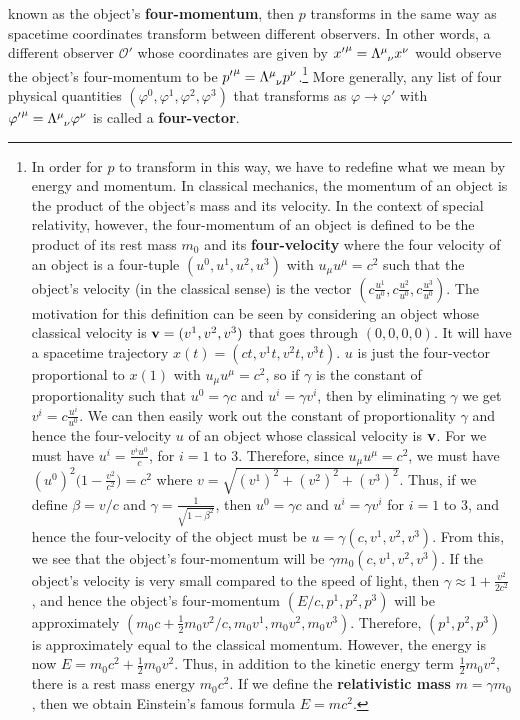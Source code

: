  known as the object's \textbf{four-momentum}, then $p$ transforms in the same way as spacetime coordinates transform between different observers. In other words, a different observer $\mathcal{O}'$ whose coordinates are given by ${x'}^\mu=\Lambda\indices{^\mu_\nu}x^\nu$ would observe the object's four-momentum to be ${p'}^\mu=\Lambda\indices{^\mu_\nu}p^\nu$.\footnote{\label{srdefivation}In order for $p$ to transform in this way, we have to redefine what we mean by energy and momentum. In classical mechanics, the momentum of an object is the product of the object's mass and its velocity. In the context of special relativity, however, the four-momentum of an object is defined to be the product of its rest mass $m_0$ and its \textbf{four-velocity} where the four velocity of an object is a four-tuple $(u^0, u^1, u^2, u^3)$ with $u_\mu u^\mu=c^2$ such that the object's velocity (in the classical sense) is the vector $(c \frac{u^1}{u^0}, c \frac{u^2}{u^0}, c\frac{u^3}{u^0})$. The motivation for this definition can be seen by considering an object whose classical velocity is $\vb{v}=(v^1,v^2,v^3)$ that goes through $(0,0,0,0)$. It will have a spacetime trajectory $x(t)=(ct, v^1 t, v^2 t, v^3 t)$. $u$ is just the four-vector proportional to $x(1)$ with $u_\mu u^\mu=c^2$, so if $\gamma$ is the constant of proportionality such that $u^0=\gamma c$ and $u^i=\gamma v^i$, then by eliminating $\gamma$ we get $v^i=c\frac{u^i}{u^0}$.  We can then easily work out the constant of proportionality $\gamma$ and hence the
four-velocity $u$ of an object whose classical velocity is $\vb{v}$. For we must have $u^i=\frac{v^i u^0}{c}$, for $i=1$ to $3$. Therefore, since $u_\mu u^\mu=c^2$, we must have $(u^0)^2\big(1-\frac{v^2}{c^2}\big)=c^2$ where $v=\sqrt{({v}^1)^2+({v}^2)^2+({v}^3)^2}$. Thus, if we define $\beta={v}/{c}$ and $\gamma=\frac{1}{\sqrt{1-\beta^2}}$, then $u^0=\gamma c$ and $u^i=\gamma v^i$ for $i=1$ to $3$, and hence the four-velocity of the object must be $u=\gamma(c,v^1,v^2,v^3).$ From this, we see that the object's four-momentum will be $\gamma m_0(c,v^1,v^2,v^3).$ If the object's velocity is very small compared to the speed of light, then $\gamma\approx 1+\frac{v^2}{2c^2}$, and hence the object's four-momentum $(E/c, p^1, p^2, p^3)$ will be approximately $(m_0c+\frac{1}{2}m_0{v^2}/c, m_0v^1,m_0v^2,m_0v^3)$. Therefore, $(p^1, p^2, p^3)$ is approximately equal to the classical momentum. However, the energy is now $E=m_0c^2+\frac{1}{2}m_0{v^2}$. Thus, in addition to the kinetic energy term $\frac{1}{2}m_0{v^2}$, there is a rest mass energy $m_0c^2$. If we define the \textbf{relativistic mass} $m=\gamma m_0$, then we obtain Einstein's famous formula $E=mc^2$.  } More generally, any list of four physical quantities $(\varphi^0, \varphi^1, \varphi^2, \varphi^3)$ that transforms as $\varphi\rightarrow\varphi'$ with  ${\varphi'}^\mu=\Lambda\indices{^\mu_\nu}\varphi^\nu$ is called a \textbf{four-vector}.   
